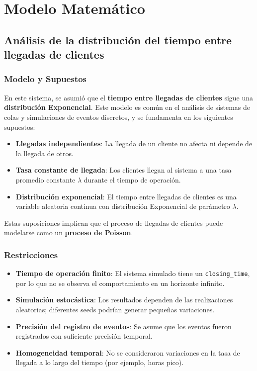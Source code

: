 \documentclass{report}
\begin{document}
\section{Modelo Matemático}\label{S4}
    \subsection{Análisis de la distribución del tiempo entre llegadas de clientes}

        \subsubsection{Modelo y Supuestos}

        En este sistema, se asumió que el \textbf{tiempo entre llegadas de clientes} sigue una \textbf{distribución Exponencial}. Este modelo es común en el análisis de sistemas de colas y simulaciones de eventos discretos, y se fundamenta en los siguientes supuestos:

        \begin{itemize}
            \item \textbf{Llegadas independientes}: La llegada de un cliente no afecta ni depende de la llegada de otros.
            \item \textbf{Tasa constante de llegada}: Los clientes llegan al sistema a una tasa promedio constante $\lambda$ durante el tiempo de operación.
            \item \textbf{Distribución exponencial}: El tiempo entre llegadas de clientes es una variable aleatoria continua con distribución Exponencial de parámetro $\lambda$.
        \end{itemize}

        Estas suposiciones implican que el proceso de llegadas de clientes puede modelarse como un \textbf{proceso de Poisson}.

        \subsubsection{Restricciones}

        \begin{itemize}
            \item \textbf{Tiempo de operación finito}: El sistema simulado tiene un \texttt{closing\_time}, por lo que no se observa el comportamiento en un horizonte infinito.
            \item \textbf{Simulación estocástica}: Los resultados dependen de las realizaciones aleatorias; diferentes seeds podrían generar pequeñas variaciones.
            \item \textbf{Precisión del registro de eventos}: Se asume que los eventos fueron registrados con suficiente precisión temporal.
            \item \textbf{Homogeneidad temporal}: No se consideraron variaciones en la tasa de llegada a lo largo del tiempo (por ejemplo, horas pico).
        \end{itemize}
\end{document}
